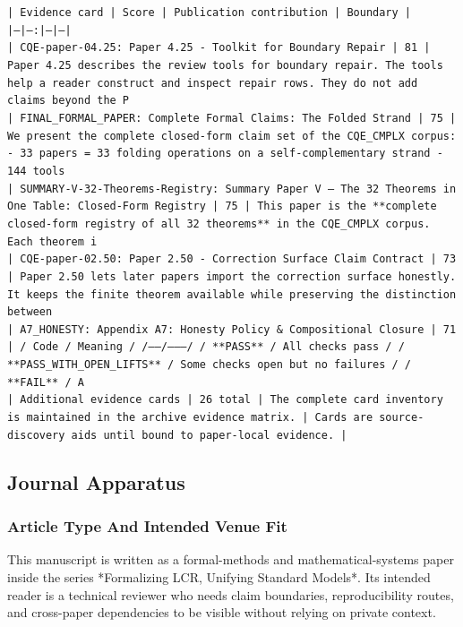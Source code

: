 \documentclass[11pt]{article}
\begin{document}
\noindent\texttt{| Evidence card | Score | Publication contribution | Boundary |}\\
\noindent\texttt{|---|---:|---|---|}\\
\noindent\texttt{| CQE-paper-04.25: Paper 4.25 - Toolkit for Boundary Repair | 81 | Paper 4.25 describes the review tools for boundary repair. The tools help a reader construct and inspect repair rows. They do not add claims beyond the P}\\
\noindent\texttt{| FINAL\_FORMAL\_PAPER: Complete Formal Claims: The Folded Strand | 75 | We present the complete closed-form claim set of the CQE\_CMPLX corpus: - 33 papers = 33 folding operations on a self-complementary strand - 144 tools}\\
\noindent\texttt{| SUMMARY-V-32-Theorems-Registry: Summary Paper V — The 32 Theorems in One Table: Closed-Form Registry | 75 | This paper is the **complete closed-form registry of all 32 theorems** in the CQE\_CMPLX corpus. Each theorem i}\\
\noindent\texttt{| CQE-paper-02.50: Paper 2.50 - Correction Surface Claim Contract | 73 | Paper 2.50 lets later papers import the correction surface honestly. It keeps the finite theorem available while preserving the distinction between}\\
\noindent\texttt{| A7\_HONESTY: Appendix A7: Honesty Policy \& Compositional Closure | 71 | / Code / Meaning / /------/---------/ / **PASS** / All checks pass / / **PASS\_WITH\_OPEN\_LIFTS** / Some checks open but no failures / / **FAIL** / A}\\
\noindent\texttt{| Additional evidence cards | 26 total | The complete card inventory is maintained in the archive evidence matrix. | Cards are source-discovery aids until bound to paper-local evidence. |}\\

\subsection*{Journal Apparatus}

\subsubsection*{Article Type And Intended Venue Fit}

This manuscript is written as a formal-methods and mathematical-systems paper
inside the series *Formalizing LCR, Unifying Standard Models*. Its intended
reader is a technical reviewer who needs claim boundaries, reproducibility
routes, and cross-paper dependencies to be visible without relying on private
context.
\end{document}
